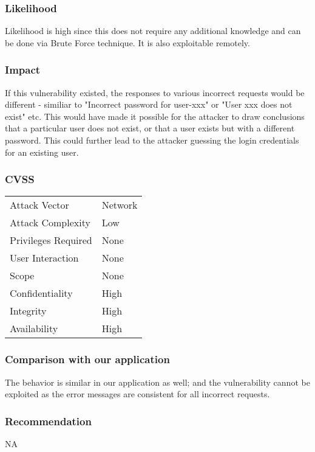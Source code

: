 \subsubsection{Likelihood}
Likelihood is high since this does not require any additional knowledge and can be done via Brute Force technique.
It is also exploitable remotely.

\subsubsection{Impact}
If this vulnerability existed, the responses to various incorrect requests would be different - similiar to "Incorrect password for user-xxx" or "User xxx does not exist" etc. This would have made it possible for the attacker to draw conclusions that a particular user does not exist, or that a user exists but with a different password. This could further lead to the attacker guessing the login credentials for an existing user.

\subsubsection{CVSS}
\begin{tabular}{l | l}
Attack Vector		& Network \\
Attack Complexity	& Low \\
Privileges Required & None \\
User Interaction	& None \\
Scope				& None \\
Confidentiality		& High \\
Integrity			& High \\
Availability		& High
\end{tabular}

\subsubsection{Comparison with our application}
The behavior is similar in our application as well; and the vulnerability cannot be exploited as the error messages are consistent for all incorrect requests.

\subsubsection{Recommendation}
NA

\clearpage